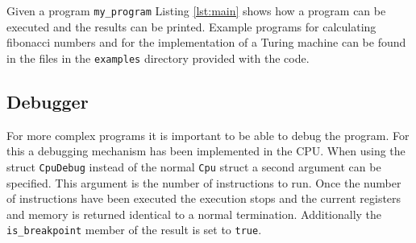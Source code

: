 Given a program \lstinline{my_program} Listing \ref{lst:main} shows how a program can be
executed and the results can be printed. Example programs for calculating fibonacci numbers
and for the implementation of a Turing machine can be found in the files in the \texttt{examples} directory provided with the code.



\subsection{Debugger}
For more complex programs it is important to be able to debug the program. For this
a debugging mechanism has been implemented in the CPU. When using the struct 
\lstinline{CpuDebug} instead of the normal \lstinline{Cpu} struct a second argument
can be specified. This argument is the number of instructions to run. Once the number
of instructions have been executed the execution stops and the current registers and
memory is returned identical to a normal termination. Additionally the \lstinline{is_breakpoint} member of the result is set to \lstinline{true}.

